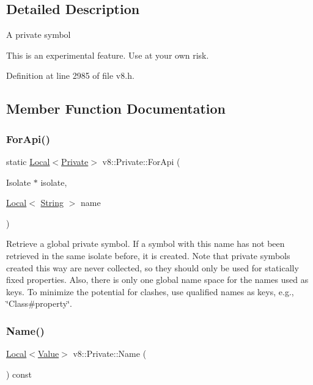 \subsection{Detailed Description}
A private symbol

This is an experimental feature. Use at your own risk. 

Definition at line 2985 of file v8.\+h.



\subsection{Member Function Documentation}
\mbox{\label{classv8_1_1Private_a0ab8628387166b8a8abc6e9b6f40ad55}} 
\subsubsection{\texorpdfstring{For\+Api()}{ForApi()}}
{\footnotesize\ttfamily static \mbox{\hyperlink{classv8_1_1Local}{Local}}$<$\mbox{\hyperlink{classv8_1_1Private}{Private}}$>$ v8\+::\+Private\+::\+For\+Api (\begin{DoxyParamCaption}\item[{Isolate $\ast$}]{isolate,  }\item[{\mbox{\hyperlink{classv8_1_1Local}{Local}}$<$ \mbox{\hyperlink{classv8_1_1String}{String}} $>$}]{name }\end{DoxyParamCaption})\hspace{0.3cm}{\ttfamily [static]}}

Retrieve a global private symbol. If a symbol with this name has not been retrieved in the same isolate before, it is created. Note that private symbols created this way are never collected, so they should only be used for statically fixed properties. Also, there is only one global name space for the names used as keys. To minimize the potential for clashes, use qualified names as keys, e.\+g., \char`\"{}\+Class\#property\char`\"{}. \mbox{\label{classv8_1_1Private_ab3bbd6a2dcf6aea73f65c95f0d216f12}} 
\subsubsection{\texorpdfstring{Name()}{Name()}}
{\footnotesize\ttfamily \mbox{\hyperlink{classv8_1_1Local}{Local}}$<$\mbox{\hyperlink{classv8_1_1Value}{Value}}$>$ v8\+::\+Private\+::\+Name (\begin{DoxyParamCaption}{ }\end{DoxyParamCaption}) const}

